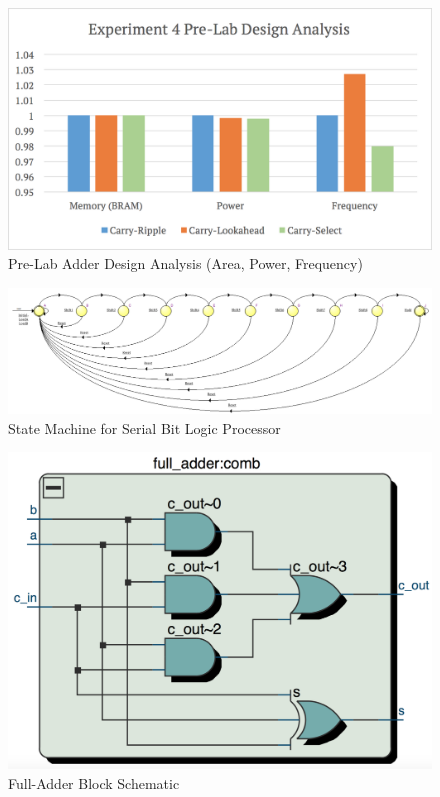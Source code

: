 \documentclass[journal, twocolumn, final,11pt,letterpaper]{IEEEtran}
\begin{document}
\begin{figure} [htbp]
	\centering
	\includegraphics[scale=0.55]{pre-lab-design-analysis.png}
	\caption{Pre-Lab Adder Design Analysis (Area, Power, Frequency)\label{fig:pre-lab-design-analysis}}
\end{figure}

\begin{figure} [htbp]
	\centering
	\includegraphics[scale=0.4]{state-machine-processor.png}
	\caption{State Machine for Serial Bit Logic Processor \label{fig:serial-processor-state-machine}}
\end{figure}

\begin{figure} [htbp]
	\centering
	\includegraphics[scale=0.4]{full-adder-block-schematic.png}
	\caption{Full-Adder Block Schematic\label{fig:full-adder-block-schematic}}
\end{figure}
\end{document}
